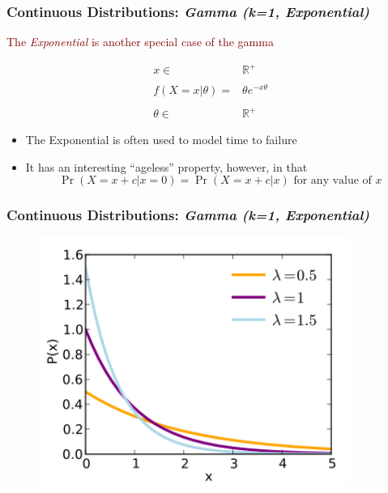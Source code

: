 \documentclass[xcolor={dvipsnames}]{beamer}
\begin{document}
\frame
{
 \frametitle{Continuous Distributions: \emph{Gamma (k=1, Exponential)}} %

 \vspace{.5em}
\textcolor{Maroon}{The \emph{Exponential} is another special case of the gamma}

 
 \vspace{-.75em}
\LARGE
 
\begin{align*}
x \in {} & \mathbb{R}^+ \\\\
f\left(X=x|\theta\right) = {} & \theta e^{-x\theta}\\\\
\theta \in {} & \mathbb{R}^+
\end{align*}

 \vspace{.5em}

\normalsize 

\begin{itemize} 
\item \textcolor{NavyBlue}{The Exponential is often used to model time to failure}
\item \textcolor{NavyBlue}{It has an interesting ``ageless'' property, however, in that
$$ \Pr(X=x+c|x=0) = \Pr(X=x+c|x) \text{ for any value of $x$}$$}
\end{itemize}

}

\frame
{
 \frametitle{Continuous Distributions: \emph{Gamma (k=1, Exponential)}}
 
\begin{figure}
\centering
\includegraphics[width=4in]{stuff/exponential.png}
\end{figure}
}
\end{document}
